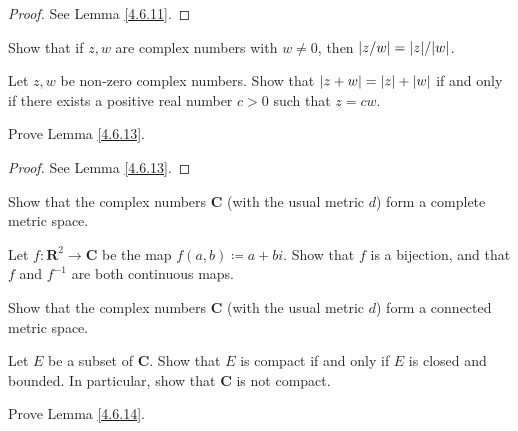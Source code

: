 \begin{proof}
    See Lemma \ref{4.6.11}.
\end{proof}

\begin{exercise}\label{ex 4.6.7}
    Show that if \(z, w\) are complex numbers with \(w \neq 0\), then \(\abs*{z / w} = \abs*{z} / \abs*{w}\).
\end{exercise}

\begin{exercise}\label{ex 4.6.8}
    Let \(z, w\) be non-zero complex numbers.
    Show that \(\abs*{z + w} = \abs*{z} + \abs*{w}\) if and only if there exists a positive real number \(c > 0\) such that \(z = cw\).
\end{exercise}

\begin{exercise}\label{ex 4.6.9}
    Prove Lemma \ref{4.6.13}.
\end{exercise}

\begin{proof}
    See Lemma \ref{4.6.13}.
\end{proof}

\begin{exercise}\label{ex 4.6.10}
    Show that the complex numbers \(\mathbf{C}\) (with the usual metric \(d\)) form a complete metric space.
\end{exercise}

\begin{exercise}\label{ex 4.6.11}
    Let \(f : \mathbf{R}^2 \to \mathbf{C}\) be the map \(f(a, b) \coloneqq a + bi\).
    Show that \(f\) is a bijection, and that \(f\) and \(f^{-1}\) are both continuous maps.
\end{exercise}

\begin{exercise}\label{ex 4.6.12}
    Show that the complex numbers \(\mathbf{C}\) (with the usual metric \(d\)) form a connected metric space.
\end{exercise}

\begin{exercise}\label{ex 4.6.13}
    Let \(E\) be a subset of \(\mathbf{C}\).
    Show that \(E\) is compact if and only if \(E\) is closed and bounded.
    In particular, show that \(\mathbf{C}\) is not compact.
\end{exercise}

\begin{exercise}\label{ex 4.6.14}
    Prove Lemma \ref{4.6.14}.
\end{exercise}

